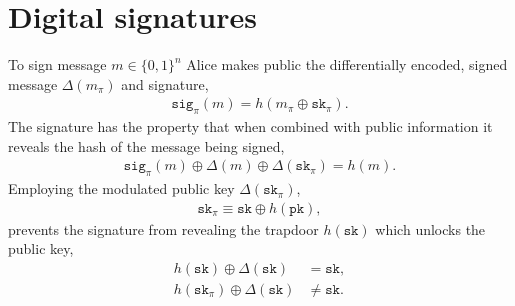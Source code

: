 \documentclass[twocolumn, aps, amsmath, amssymb, nofootinbib, superscriptaddress, longbibliography, doublefloatfix, table-of-contents, eqsecnum, rmp]{revtex4-2}
\begin{document}
%
%
%

\section{Digital signatures}

To sign message \mbox{$m\in\{0,1\}^n$} Alice makes public the differentially encoded, signed message $\Delta(m_\pi)$ and signature,
\begin{align}
	 \mathtt{sig}_\pi(m) = h(m_\pi \oplus \mathtt{sk}_\pi).
\end{align}
The signature has the property that when combined with public information it reveals the hash of the message being signed,
\begin{align}
	 \mathtt{sig}_\pi(m) \oplus \Delta(m) \oplus \Delta(\mathtt{sk}_\pi) = h(m).
\end{align}
Employing the modulated public key $\Delta(\mathtt{sk}_\pi)$,
\begin{align}
	\mathtt{sk}_\pi \equiv \mathtt{sk} \oplus h(\mathtt{pk}),
\end{align}
prevents the signature from revealing the trapdoor $h(\mathtt{sk})$ which unlocks the public key,
\begin{align}
	h(\mathtt{sk}) \oplus \Delta(\mathtt{sk}) &= \mathtt{sk},\nonumber\\
	h(\mathtt{sk}_\pi) \oplus \Delta(\mathtt{sk}) &\neq \mathtt{sk}.
\end{align}

\end{document}
